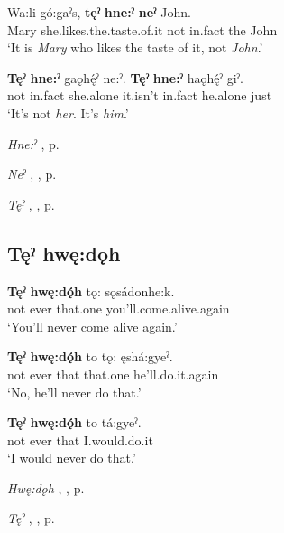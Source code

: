 \ea
\label{ex:tpart48}
\gll Wa:li gó:gaˀs, \textbf{tęˀ} \textbf{hne:ˀ} \textbf{neˀ} John.\\
Mary she.likes.the.taste.of.it not in.fact the John\\
\glt ‘It is \emph{Mary} who likes the taste of it, not \emph{John}.’
\z

\ea
\label{ex:tpart49}
\gll \textbf{Tęˀ} \textbf{hne:ˀ} gaǫhę́ˀ ne:ˀ. \textbf{Tęˀ} \textbf{hne:ˀ} haǫhę́ˀ giˀ.\\
not in.fact she.alone it.isn’t in.fact he.alone just\\
\glt ‘It’s not \emph{her}. It’s \emph{him}.’
\z

\begin{CayugaRelated}
\item \textit{Hne:ˀ} , p. \pageref{p:[hne:ˀ] ‘in fact’}\\
\item \textit{Neˀ} , , p. \pageref{p:[neˀ]}\\
\item \textit{Tęˀ} , , p. \pageref{p:[tęˀ]}
\end{CayugaRelated}

\subsection*{\textbf{Tęˀ hwę:dǫh} } \label{p:[tęˀ hwę:dǫh]}

\ea
\label{ex:tpart50}
\gll \textbf{Tęˀ} \textbf{hwę:dǫ́h} tǫ: sǫsádonhe:k.\\
not ever that.one you’ll.come.alive.again\\
\glt ‘You’ll never come alive again.’
\z

\ea
\label{ex:tpart51}
\gll \textbf{Tęˀ} \textbf{hwę:dǫ́h} to tǫ: ęshá:gyeˀ.\\
not ever that that.one he’ll.do.it.again\\
\glt ‘No, he’ll never do that.’
\z

\ea
\label{ex:tpart52}
\gll \textbf{Tęˀ} \textbf{hwę:dǫ́h} to tá:gyeˀ.\\
not ever that I.would.do.it\\
\glt ‘I would never do that.’
\z

\begin{CayugaRelated}
\item \textit{Hwę:dǫh} , , p. \pageref{p:[hwę:dǫh]}\\
\item \textit{Tęˀ} , , p. \pageref{p:[tęˀ]}
\end{CayugaRelated}

